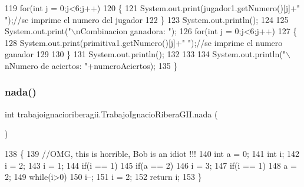 \begin{DoxyCode}
119                 \textcolor{keywordflow}{for}(\textcolor{keywordtype}{int} j = 0;j<6;j++)
120                 \{
121                     System.out.print(jugador1.getNumero()[j]+\textcolor{stringliteral}{" "});\textcolor{comment}{//se imprime el numero del jugador}
122                 \}
123                 System.out.println();
124                 
125                 System.out.print(\textcolor{stringliteral}{"\(\backslash\)nCombinacion ganadora: "});
126                 \textcolor{keywordflow}{for}(\textcolor{keywordtype}{int} j = 0;j<6;j++)
127                 \{
128                     System.out.print(primitiva1.getNumero()[j]+\textcolor{stringliteral}{"  "});\textcolor{comment}{//se imprime el numero ganador}
129                     
130                 \}
131                     System.out.println();
132                 
133                 
134                 System.out.println(\textcolor{stringliteral}{"\(\backslash\)nNumero de aciertos: "}+numeroAciertos);
135         \}
\end{DoxyCode}
\mbox{\label{classtrabajoignacioriberagii_1_1_trabajo_ignacio_ribera_g_i_i_a426bae568b1ab10ba20f9a2c0ed09a46}} 
\subsubsection{\texorpdfstring{nada()}{nada()}}
{\footnotesize\ttfamily int trabajoignacioriberagii.\+Trabajo\+Ignacio\+Ribera\+G\+I\+I.\+nada (\begin{DoxyParamCaption}{ }\end{DoxyParamCaption})\hspace{0.3cm}{\ttfamily [inline]}}


\begin{DoxyCode}
138     \{
139                   \textcolor{comment}{//OMG, this is horrible, Bob is an idiot !!!}
140                 \textcolor{keywordtype}{int} a = 0;
141         \textcolor{keywordtype}{int} i;
142         i = 2;
143         i = 1;
144         \textcolor{keywordflow}{if}(i == 1)
145             \textcolor{keywordflow}{if}(a == 2)
146                 i = 3;
147         \textcolor{keywordflow}{if}(i == 1)
148             a = 2;
149         \textcolor{keywordflow}{while}(i>0)
150         i--;
151         i = 2;
152         \textcolor{keywordflow}{return} i;
153     \}
\end{DoxyCode}


